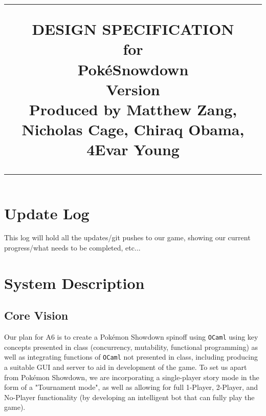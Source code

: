\documentclass{scrreprt}
\title{%
\flushleft
\rule{16cm}{5pt}\vskip1cm
\Huge{DESIGN SPECIFICATION}\\
for\\
Pok\'eSnowdown \\
\vspace{2cm}
\LARGE{Version \myversion\\}
\vspace{2cm}
Produced by Matthew Zang, Nicholas Cage, Chiraq Obama, 4Evar Young\\
\vfill
\rule{16cm}{5pt}
}
\date{}
\begin{document}
\maketitle
\tableofcontents
\restoregeometry
\chapter*{Update Log}

This log will hold all the updates/git pushes to our game, showing our current progress/what needs to be completed, etc...

\chapter{System Description}
\section{Core Vision}

Our plan for A6 is to create a Pok\'emon Showdown spinoff using \texttt{OCaml} using key concepts presented in class (concurrency, mutability, functional programming) as well as integrating functions of \texttt{OCaml} not presented in class, including producing a suitable GUI and server to aid in development of the game. To set us apart from Pok\'emon Showdown, we are incorporating a single-player story mode in the form of a "Tournament mode", as well as allowing for full 1-Player, 2-Player, and No-Player functionality (by developing an intelligent bot that can fully play the game).
\end{document}
